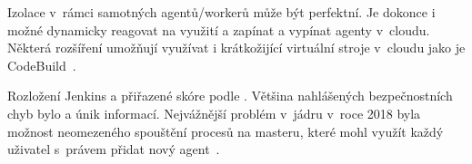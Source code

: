         Izolace v~rámci samotných agentů/workerů může být perfektní. Je dokonce i možné dynamicky reagovat na využití a zapínat a vypínat agenty v~cloudu. Některá rozšíření umožňují využívat i krátkožijící virtuální stroje v~cloudu jako je  CodeBuild~\cite{jenkins-codebuild}.

        \begin{iffigure}
            \centering
            \caption{Rozložení Jenkins  a přiřazené skóre podle . Většina nahlášených bezpečnostních chyb bylo  a únik informací. Nejvážnější problém v~jádru v~roce 2018 byla možnost neomezeného spouštění procesů na masteru, které mohl využít každý uživatel s~právem přidat nový agent~\cite{cve-jenkins}.}
            \label{fig:gitlab-review-cycle}
        \end{iffigure}

